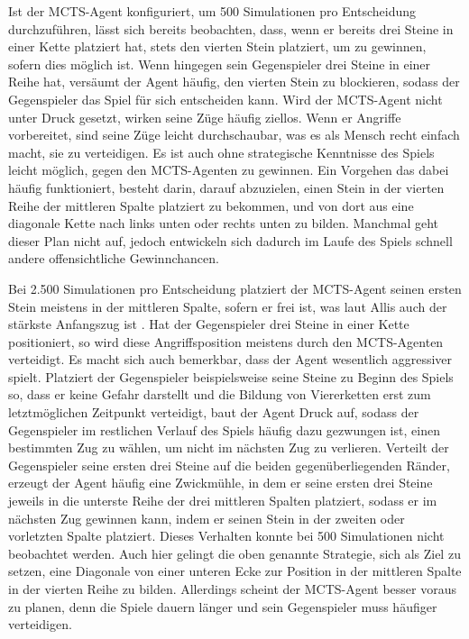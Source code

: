 Ist der MCTS-Agent konfiguriert, um 500 Simulationen pro Entscheidung durchzuführen, lässt sich bereits beobachten, dass, wenn er bereits drei Steine in einer Kette platziert hat, stets den vierten Stein platziert, um zu gewinnen, sofern dies möglich ist. Wenn hingegen sein Gegenspieler drei Steine in einer Reihe hat, versäumt der Agent häufig, den vierten Stein zu blockieren, sodass der Gegenspieler das Spiel für sich entscheiden kann. Wird der MCTS-Agent nicht unter Druck gesetzt, wirken seine Züge häufig ziellos. Wenn er Angriffe vorbereitet, sind seine Züge leicht durchschaubar, was es als Mensch recht einfach macht, sie zu verteidigen. Es ist auch ohne strategische Kenntnisse des Spiels leicht möglich, gegen den MCTS-Agenten zu gewinnen. Ein Vorgehen das dabei häufig funktioniert, besteht darin, darauf abzuzielen, einen Stein in der vierten Reihe der mittleren Spalte platziert zu bekommen, und von dort aus eine diagonale Kette nach links unten oder rechts unten zu bilden. Manchmal geht dieser Plan nicht auf, jedoch entwickeln sich dadurch im Laufe des Spiels schnell andere offensichtliche Gewinnchancen.

Bei 2.500 Simulationen pro Entscheidung platziert der MCTS-Agent seinen ersten Stein meistens in der mittleren Spalte, sofern er frei ist, was laut Allis auch der stärkste Anfangszug ist \cite{Allis.1988}. Hat der Gegenspieler drei Steine in einer Kette positioniert, so wird diese Angriffsposition meistens durch den MCTS-Agenten verteidigt. Es macht sich auch bemerkbar, dass der Agent wesentlich aggressiver spielt. Platziert der Gegenspieler beispielsweise seine Steine zu Beginn des Spiels so, dass er keine Gefahr darstellt und die Bildung von Viererketten erst zum letztmöglichen Zeitpunkt verteidigt, baut der Agent Druck auf, sodass der Gegenspieler im restlichen Verlauf des Spiels häufig dazu gezwungen ist, einen bestimmten Zug zu wählen, um nicht im nächsten Zug zu verlieren. Verteilt der Gegenspieler seine ersten drei Steine auf die beiden gegenüberliegenden Ränder, erzeugt der Agent häufig eine Zwickmühle, in dem er seine ersten drei Steine jeweils in die unterste Reihe der drei mittleren Spalten platziert, sodass er im nächsten Zug gewinnen kann, indem er seinen Stein in der zweiten oder vorletzten Spalte platziert. Dieses Verhalten konnte bei 500 Simulationen nicht beobachtet werden. Auch hier gelingt die oben genannte Strategie, sich als Ziel zu setzen, eine Diagonale von einer unteren Ecke zur Position in der mittleren Spalte in der vierten Reihe zu bilden. Allerdings scheint der MCTS-Agent besser voraus zu planen, denn die Spiele dauern länger und sein Gegenspieler muss häufiger verteidigen.

